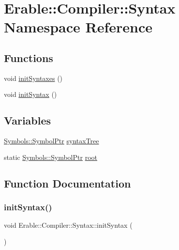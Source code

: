 \hypertarget{namespace_erable_1_1_compiler_1_1_syntax}{}\section{Erable\+::Compiler\+::Syntax Namespace Reference}
\label{namespace_erable_1_1_compiler_1_1_syntax}
\subsection*{Functions}
\begin{DoxyCompactItemize}
\item 
void \mbox{\hyperlink{namespace_erable_1_1_compiler_1_1_syntax_ab106bf5dfac4f663f37aab77e5469398}{init\+Syntaxes}} ()
\item 
void \mbox{\hyperlink{namespace_erable_1_1_compiler_1_1_syntax_a4dde89d8378cb3d9f82ca7f6e125956e}{init\+Syntax}} ()
\end{DoxyCompactItemize}
\subsection*{Variables}
\begin{DoxyCompactItemize}
\item 
\mbox{\hyperlink{namespace_erable_1_1_compiler_1_1_symbols_a8f0bc762f448ea4d84e8713ab3e140b9}{Symbols\+::\+Symbol\+Ptr}} \mbox{\hyperlink{namespace_erable_1_1_compiler_1_1_syntax_aecadb35dfe58c16e1f917013dd6bbb9d}{syntax\+Tree}}
\item 
static \mbox{\hyperlink{namespace_erable_1_1_compiler_1_1_symbols_a8f0bc762f448ea4d84e8713ab3e140b9}{Symbols\+::\+Symbol\+Ptr}} \mbox{\hyperlink{namespace_erable_1_1_compiler_1_1_syntax_af31d967bc79a55ea76b36bf8c77458fb}{root}}
\end{DoxyCompactItemize}


\subsection{Function Documentation}
\mbox{\label{namespace_erable_1_1_compiler_1_1_syntax_a4dde89d8378cb3d9f82ca7f6e125956e}} 
\subsubsection{\texorpdfstring{initSyntax()}{initSyntax()}}
{\footnotesize\ttfamily void Erable\+::\+Compiler\+::\+Syntax\+::init\+Syntax (\begin{DoxyParamCaption}{ }\end{DoxyParamCaption})}


